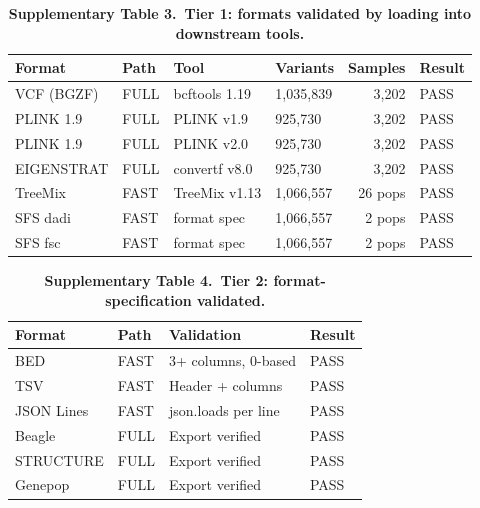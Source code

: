 \documentclass[11pt,a4paper]{article}
\begin{document}
\begin{table}[p]
\centering
\caption*{\textbf{Supplementary Table 3.~Tier 1: formats validated by loading into downstream tools.}}
\vspace{0.5em}
\begin{tabular}{@{}llllrl@{}}
\toprule
Format & Path & Tool & Variants & Samples & Result \\
\midrule
VCF (BGZF) & FULL & bcftools 1.19 & 1,035,839 & 3,202 & PASS \\
PLINK 1.9 & FULL & PLINK v1.9 & 925,730 & 3,202 & PASS \\
PLINK 1.9 & FULL & PLINK v2.0 & 925,730 & 3,202 & PASS \\
EIGENSTRAT & FULL & convertf v8.0 & 925,730 & 3,202 & PASS \\
TreeMix & FAST & TreeMix v1.13 & 1,066,557 & 26 pops & PASS \\
SFS dadi & FAST & format spec & 1,066,557 & 2 pops & PASS \\
SFS fsc & FAST & format spec & 1,066,557 & 2 pops & PASS \\
\bottomrule
\end{tabular}
\end{table}

\clearpage

\begin{table}[p]
\centering
\caption*{\textbf{Supplementary Table 4.~Tier 2: format-specification validated.}}
\vspace{0.5em}
\begin{tabular}{@{}llll@{}}
\toprule
Format & Path & Validation & Result \\
\midrule
BED & FAST & 3+ columns, 0-based & PASS \\
TSV & FAST & Header + columns & PASS \\
JSON Lines & FAST & json.loads per line & PASS \\
Beagle & FULL & Export verified & PASS \\
STRUCTURE & FULL & Export verified & PASS \\
Genepop & FULL & Export verified & PASS \\
\bottomrule
\end{tabular}
\end{table}

\clearpage
\end{document}
